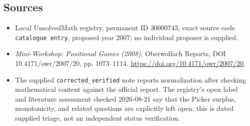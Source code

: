 \documentclass[11pt]{article}
\begin{document}
\subsection{Sources}
\begin{itemize}
\item Local UnsolvedMath registry, permanent ID \(30000743\), exact source code \texttt{catalogue entry}, proposed year 2007; no individual proposer is supplied.
\item \emph{Mini-Workshop: Positional Games (2008)}, Oberwolfach Reports, DOI 10.4171/owr/2007/20, pp. 1073--1114. \url{https://doi.org/10.4171/owr/2007/20}.
\item The supplied \texttt{corrected\_verified} note reports normalization after checking mathematical content against the official report. The registry's open label and literature assessment checked 2026-08-21 say that the Picker surplus, monotonicity, and related questions are explicitly left open; this is dated supplied triage, not an independent status verification.
\end{itemize}
\end{document}
